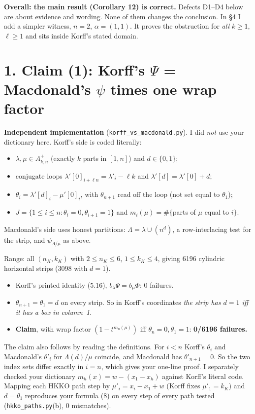\documentclass[10pt]{article}
\begin{document}
\textbf{Overall: the main result (Corollary 12) is correct.} Defects D1--D4 below are about evidence and
wording. None of them changes the conclusion. In \S4 I add a simpler witness, $n=2$, $\alpha=(1,1)$. It proves
the obstruction for \emph{all} $k\ge1$, $\ell\ge1$ and sits inside Korff's stated domain.

\section*{1. Claim (1): Korff's $\Psi$ = Macdonald's $\psi$ times one wrap factor}
\textbf{Independent implementation} (\texttt{korff\_vs\_macdonald.py}). I did \emph{not} use your dictionary
here. Korff's side is coded literally:
\begin{itemize}
\item $\lambda,\mu\in A^+_{k,n}$ (exactly $k$ parts in $[1,n]$) and $d\in\{0,1\}$;
\item conjugate loops $\lambda'[0]_{i+\ell n}=\lambda'_i-\ell k$ and $\lambda'[d]=\lambda'[0]+d$;
\item $\theta_i=\lambda'[d]_i-\mu'[0]_i$, with $\theta_{n+1}$ read off the loop (not set equal to $\theta_1$);
\item $J=\{1\le i\le n:\theta_i=0,\theta_{i+1}=1\}$ and $m_i(\mu)=\#\{$parts of $\mu$ equal to $i\}$.
\end{itemize}
Macdonald's side uses honest partitions: $\Lambda=\lambda\cup(n^d)$, a row-interlacing test for the strip, and
$\psi_{\Lambda/\mu}$ as above.

Range: all $(n_K,k_K)$ with $2\le n_K\le6$, $1\le k_K\le4$, giving 6196 cylindric horizontal strips (3098 with
$d=1$).
\begin{itemize}
\item Korff's printed identity (5.16), $b_\lambda\Psi=b_\mu\Phi$: 0 failures.
\item $\theta_{n+1}=\theta_1=d$ on every strip. So in Korff's coordinates \emph{the strip has $d=1$ iff it has a box in column~1}.
\item \textbf{Claim}, with wrap factor $(1-t^{m_n(\mu)})$ iff $\theta_n=0,\theta_1=1$: \textbf{0/6196 failures.}
\end{itemize}
The claim also follows by reading the definitions. For $i<n$ Korff's $\theta_i$ and Macdonald's $\theta'_i$ for
$\Lambda(d)/\mu$ coincide, and Macdonald has $\theta'_{n+1}=0$. So the two index sets differ exactly in $i=n$, which
gives your one-line proof. I separately checked your dictionary $m_h(x)=w-(x_1-x_h)$ against Korff's literal code.
Mapping each HKKO path step by $\mu'_i=x_i-x_1+w$ (Korff fixes $\mu'_1=k_K$) and $d=\theta_1$ reproduces your
formula (8) on every step of every path tested (\texttt{hkko\_paths.py}(b), 0 mismatches).
\end{document}
